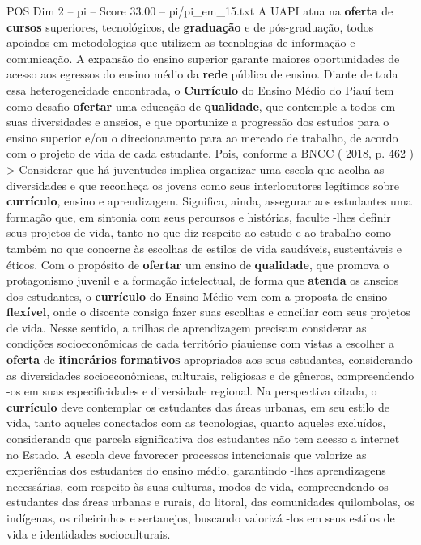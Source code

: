 \begin{textsample}{POS Dim 2 – pi – Score 33.00 – pi/pi\_em\_15.txt}
A UAPI atua na \textbf{oferta} de \textbf{cursos} superiores, tecnológicos, de \textbf{graduação} e de pós-graduação, todos apoiados em metodologias que utilizem as tecnologias de informação e comunicação.
A expansão do ensino superior garante maiores oportunidades de acesso aos egressos do ensino médio da \textbf{rede} pública de ensino.
Diante de toda essa heterogeneidade encontrada, o \textbf{Currículo} do Ensino Médio do Piauí tem como desafio \textbf{ofertar} uma educação de \textbf{qualidade}, que contemple a todos em suas diversidades e anseios, e que oportunize a progressão dos estudos para o ensino superior e/ou o direcionamento para ao mercado de trabalho, de acordo com o projeto de vida de cada estudante.
Pois, conforme a BNCC ( 2018, p. 462 ) > Considerar que há juventudes implica organizar uma escola que acolha as diversidades e que reconheça os jovens como seus interlocutores legítimos sobre \textbf{currículo}, ensino e aprendizagem.
Significa, ainda, assegurar aos estudantes uma formação que, em sintonia com seus percursos e histórias, faculte -lhes definir seus projetos de vida, tanto no que diz respeito ao estudo e ao trabalho como também no que concerne às escolhas de estilos de vida saudáveis, sustentáveis e éticos.
Com o propósito de \textbf{ofertar} um ensino de \textbf{qualidade}, que promova o protagonismo juvenil e a formação intelectual, de forma que \textbf{atenda} os anseios dos estudantes, o \textbf{currículo} do Ensino Médio vem com a proposta de ensino \textbf{flexível}, onde o discente consiga fazer suas escolhas e conciliar com seus projetos de vida.
Nesse sentido, a trilhas de aprendizagem precisam considerar as condições socioeconômicas de cada território piauiense com vistas a escolher a \textbf{oferta} de \textbf{itinerários} \textbf{formativos} apropriados aos seus estudantes, considerando as diversidades socioeconômicas, culturais, religiosas e de gêneros, compreendendo -os em suas especificidades e diversidade regional.
Na perspectiva citada, o \textbf{currículo} deve contemplar os estudantes das áreas urbanas, em seu estilo de vida, tanto aqueles conectados com as tecnologias, quanto aqueles excluídos, considerando que parcela significativa dos estudantes não tem acesso a internet no Estado.
A escola deve favorecer processos intencionais que valorize as experiências dos estudantes do ensino médio, garantindo -lhes aprendizagens necessárias, com respeito às suas culturas, modos de vida, compreendendo os estudantes das áreas urbanas e rurais, do litoral, das comunidades quilombolas, os indígenas, os ribeirinhos e sertanejos, buscando valorizá -los em seus estilos de vida e identidades socioculturais.

\end{textsample}
